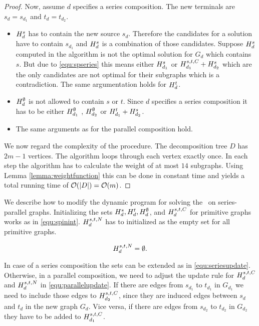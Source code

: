 \begin{proof}
	Now, assume $d$ specifies a series composition. The new terminals are $s_d = s_{d_1}$ and $t_d = t_{d_2}$.
	\begin{itemize}
		\item $H_{d}^{s}$ has to contain the new source $s_d$. Therefore the candidates for a solution have to contain $s_{d_1}$ and $H_{d}^{s}$ is a combination of those candidates. Suppose $H_{d}^{s}$ computed in the algorithm is not the optimal solution for $G_d$ which contains $s$. But due to \eqref{equ:spseries} this means either $H_{d_1}^{s}$ or $H_{d_1}^{s,t,C} + H_{d_2}^{s}$ which are the only candidates are not optimal for their subgraphs which is a contradiction. The same argumentation holds for $H_{d}^{t}$.
		\item $H_{d}^{\emptyset}$ is not allowed to contain $s$ or $t$. Since $d$ specifies a series composition it has to be either $H_{d_1}^{\emptyset}$ , $H_{d_2}^{\emptyset}$ or $H_{d_1}^{t} + H_{d_2}^{s}$.
		\item The same arguments as for the parallel composition hold.
	\end{itemize}

	We now regard the complexity of the procedure. The decomposition tree $D$ has $2m - 1$ vertices. The algorithm loops through each vertex exactly once. In each step the algorithm has to calculate the weight of at most $14$ subgraphs. Using Lemma \ref{lemma:weightfunction} this can be done in constant time and yields a total running time of $\mathcal{O}(|D|) = \mathcal{O}(m)$.	
\end{proof}

We describe how to modify the dynamic program for solving the \WISP\ on series-parallel graphs. Initializing the sets $H_{d}^{s}, H_{d}^{t}, H_{d}^{\emptyset}$, and $H_{d}^{s,t,C}$ for primitive graphs works as in \eqref{equ:spinint}. $H_{d}^{s,t,N}$ has to initialized as the empty set for all primitive graphs.

\begin{equation}
	\label{equ:initwisp}
	H_{d}^{s,t,N} = \emptyset.
\end{equation} 

In case of a series composition the sets can be extended as in \eqref{equ:seriesupdate}. Otherwise, in a parallel composition, we need to adjust the update rule for $H_{d}^{s,t,C}$ and $H_{d}^{s,t,N}$ in \eqref{equ:parallelupdate}. If there are edges from $s_{d_1}$ to $t_{d_1}$ in $G_{d_1}$ we need to include those edges to $H_{d_2}^{s,t,C}$, since they are induced edges between $s_d$ and $t_d$ in the new graph $G_d$. Vice versa, if there are edges from $s_{d_2}$ to $t_{d_2}$ in $G_{d_2}$ they have to be added to $H_{d_1}^{s,t,C}$.\medskip

